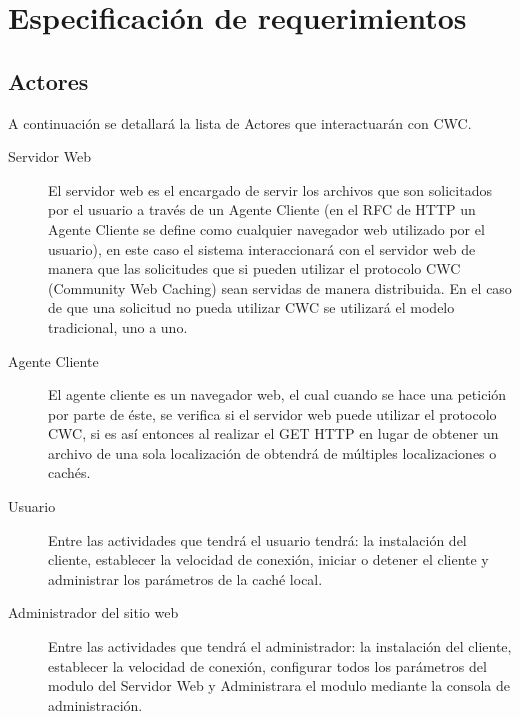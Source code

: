 
\chapter{Especificación de requerimientos} %

\label{ch:especificacion_requerimientos} %


\section{Actores}

A continuación se detallará la lista de Actores que interactuarán con CWC. 

\begin{description}
\item[Servidor Web] El servidor web es el encargado de servir los archivos que son solicitados por el usuario a través de un Agente Cliente (en el RFC de HTTP \cite{rfc2616} un Agente Cliente se define como cualquier navegador web utilizado por el usuario), en este caso el sistema interaccionará con el servidor web de manera que las solicitudes que si pueden utilizar el protocolo CWC (Community Web Caching) sean servidas de manera distribuida. En el caso de que una solicitud no pueda utilizar CWC se utilizará el modelo tradicional, uno a uno.
\item[Agente Cliente] El agente cliente es un navegador web, el cual cuando se hace una petición por parte de éste, se verifica si el servidor web puede utilizar el protocolo CWC, si es así entonces al realizar el GET HTTP en lugar de obtener un archivo de una sola localización de obtendrá de múltiples localizaciones o cachés.
\item[Usuario] Entre las actividades que tendrá el usuario tendrá: la instalación del cliente, establecer la velocidad de conexión, iniciar o detener el cliente y administrar los parámetros de la caché local. 
\item[Administrador del sitio web] Entre las actividades que tendrá el administrador: la instalación del cliente, establecer la velocidad de conexión, configurar todos los parámetros del modulo del Servidor Web y Administrara el modulo mediante la consola de administración.
\end{description}

